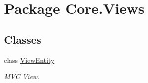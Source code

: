 \hypertarget{namespaceCore_1_1Views}{\section{Package Core.\-Views}
\label{namespaceCore_1_1Views}
}
\subsection*{Classes}
\begin{DoxyCompactItemize}
\item 
class \hyperlink{classCore_1_1Views_1_1ViewEntity}{View\-Entity}
\begin{DoxyCompactList}\small\item\em M\-V\-C View. \end{DoxyCompactList}\end{DoxyCompactItemize}
